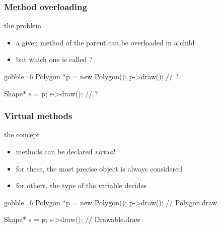 \begin{frame}[fragile]
  \frametitle{Method overloading}
  \begin{block}{the problem}
    \begin{itemize}
    \item a given method of the parent can be overloaded in a child
    \item but which one is called ?
    \end{itemize}
  \end{block}
  \begin{multicols}{2}
    \begin{cppcode*}{gobble=6}
      Polygon *p = new Polygon();
      p->draw(); // ?
      
      Shape* s = p;
      s->draw(); // ?
    \end{cppcode*}
    \columnbreak
    \center
  \end{multicols}
\end{frame}


\begin{frame}[fragile]
  \frametitle{Virtual methods}
  \begin{block}{the concept}
    \begin{itemize}
    \item methods can be declared {\it virtual}
    \item for these, the most precise object is always considered
    \item for others, the type of the variable decides
    \end{itemize}
  \end{block}
  \pause
  \begin{multicols}{2}
    \begin{cppcode*}{gobble=6}
      Polygon *p = new Polygon();
      p->draw(); // Polygon.draw
      
      Shape* s = p;
      s->draw(); // Drawable.draw
    \end{cppcode*}
    \columnbreak
    \center
  \end{multicols}    
\end{frame}

